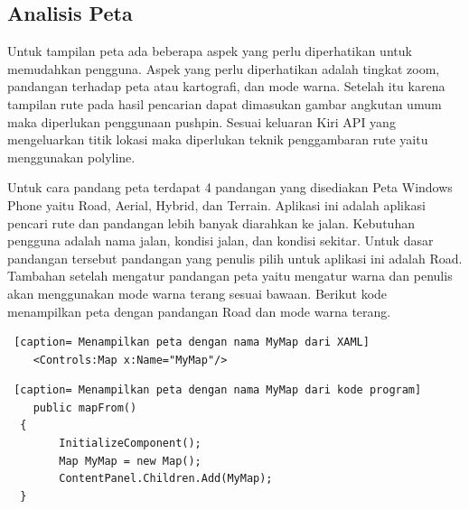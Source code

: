 \subsection{Analisis Peta}
\label{lab:Analisis Peta}
\hspace{0.5cm} Untuk tampilan peta ada beberapa aspek yang perlu diperhatikan untuk memudahkan pengguna. Aspek yang perlu diperhatikan adalah tingkat zoom, pandangan terhadap peta atau kartografi, dan mode warna. Setelah itu karena tampilan rute pada hasil pencarian dapat dimasukan gambar angkutan umum maka diperlukan penggunaan pushpin. Sesuai keluaran Kiri API yang mengeluarkan titik lokasi maka diperlukan teknik penggambaran rute yaitu menggunakan polyline.

\hspace{0.5cm} Untuk cara pandang peta terdapat 4 pandangan yang disediakan Peta Windows Phone yaitu Road, Aerial, Hybrid, dan Terrain. Aplikasi ini adalah aplikasi pencari rute dan pandangan lebih banyak diarahkan ke jalan. Kebutuhan pengguna adalah nama jalan, kondisi jalan, dan kondisi sekitar. Untuk dasar pandangan tersebut pandangan yang penulis pilih untuk aplikasi ini adalah Road. Tambahan setelah mengatur pandangan peta yaitu mengatur warna dan penulis akan menggunakan mode warna terang sesuai bawaan. Berikut kode menampilkan peta dengan pandangan Road dan mode warna terang.

\begin{lstlisting} [caption= Menampilkan peta dengan nama MyMap dari XAML]
	<Controls:Map x:Name="MyMap"/>
\end{lstlisting}

\begin{lstlisting} [caption= Menampilkan peta dengan nama MyMap dari kode program]
	public mapFrom()
  {
		InitializeComponent();
		Map MyMap = new Map();
		ContentPanel.Children.Add(MyMap);
  }
\end{lstlisting}


